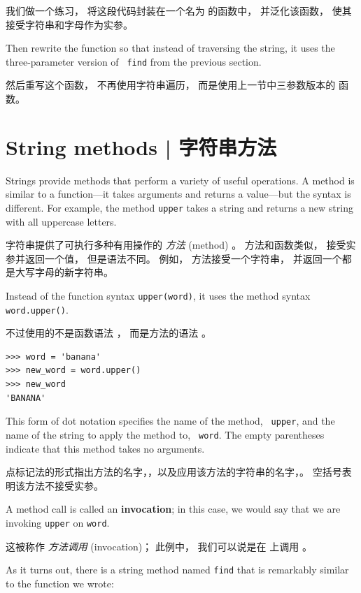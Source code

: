 我们做一个练习， 将这段代码封装在一个名为  的函数中， 并泛化该函数， 使其接受字符串和字母作为实参。

Then rewrite the function so that instead of
traversing the string, it uses the three-parameter version of {\tt
find} from the previous section.

然后重写这个函数， 不再使用字符串遍历， 而是使用上一节中三参数版本的  函数。

\section{String methods  |  字符串方法}
\label{optional}

Strings provide methods that perform a variety of useful operations.
A method is similar to a function---it takes arguments and
returns a value---but the syntax is different.  For example, the
method {\tt upper} takes a string and returns a new string with
all uppercase letters.
  

字符串提供了可执行多种有用操作的 {\em 方法} (method) 。 方法和函数类似， 接受实参并返回一个值， 但是语法不同。 例如， 方法接受一个字符串， 并返回一个都是大写字母的新字符串。

Instead of the function syntax {\tt upper(word)}, it uses
the method syntax {\tt word.upper()}.

不过使用的不是函数语法  ， 而是方法的语法 。

\begin{lstlisting}
>>> word = 'banana'
>>> new_word = word.upper()
>>> new_word
'BANANA'
\end{lstlisting}

%
This form of dot notation specifies the name of the method, {\tt
upper}, and the name of the string to apply the method to, {\tt
word}.  The empty parentheses indicate that this method takes no
arguments.
  

点标记法的形式指出方法的名字，，以及应用该方法的字符串的名字，。 空括号表明该方法不接受实参。

A method call is called an {\bf invocation}; in this case, we would
say that we are invoking {\tt upper} on {\tt word}.

这被称作 {\em 方法调用} (invocation)； 此例中， 我们可以说是在  上调用  。

As it turns out, there is a string method named {\tt find} that
is remarkably similar to the function we wrote:

